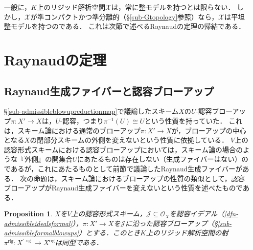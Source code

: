 \documentclass[a4paper,12pt, dvipdfmx]{jsbook}
\def\O{\mathscr{O}}
\def\rig{\mathop{\mathrm{rig}}\nolimits}
\theoremstyle{plain}
\newtheorem{prop}[thm]{\bfseries Proposition}
\theoremstyle{definition}
\begin{document}
一般に，$K$上のリジッド解析空間$\mathcal{X}$は，常に整モデルを持つとは限らない．
しかし，$\mathcal{X}$が準コンパクトかつ準分離的（\S\ref{sub-Gtopology}参照）なら，$\mathcal{X}$は平坦整モデルを持つのである．
これは次節で述べるRaynaudの定理の帰結である．

\section{Raynaudの定理}\label{sec-Raynaudtheorem}
\subsection{Raynaud生成ファイバーと認容ブローアップ}\label{sub-Raynaudtheorem1}
\S\ref{sub-admissibleblowupreductionmap}で議論したスキーム$X$の$U$-認容ブローアップ$\pi\colon X'\rightarrow X$は，$U$-認容，つまり$\pi^{-1}(U)\cong U$という性質を持っていた．
これは，スキーム論における通常のブローアップ$\pi\colon X'\rightarrow X$が，ブローアップの中心となる$X$の閉部分スキームの外側を変えないという性質に依拠している．
$V$上の認容形式スキームにおける認容ブローアップにおいては，スキーム論の場合のような『外側』の開集合$U$にあたるものは存在しない（生成ファイバーはない）のであるが，これにあたるものとして前節で議論したRaynaud生成ファイバーがある．
次の命題は，スキーム論におけるブローアップの性質の類似として，認容ブローアップがRaynaud生成ファイバーを変えないという性質を述べたものである．
\begin{prop}\label{prop-admissibleblowupinvariance}{\rm 
$X$を$V$上の認容形式スキーム，$\mathscr{J}\subseteq\O_X$を認容イデアル（\ref{dfn-admissibleidealsformal}），$\pi\colon X'\rightarrow X$を$\mathscr{J}$に沿った認容ブローアップ（\S\ref{sub-admissibleformalblowups}）とする．このとき$K$上のリジッド解析空間の射$\pi^{\rig}\colon X^{\prime\rig}\rightarrow X^{\rig}$は同型である．}
\end{prop}
\end{document}
